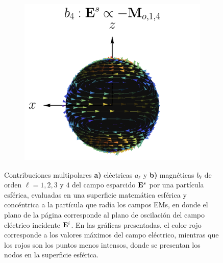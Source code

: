 \begin{figure}[h!]
\begin{subfigure}{.9\linewidth}
		\includegraphics[scale=.25]{1-Teoria/figs/Mo14_static_crop.png}%
		\end{subfigure}
		\caption{Contribuciones multipolares \textbf{a)} eléctricas $a_\ell$ y \textbf{b)} magnéticas $b_\ell$ de orden $\ell = 1,2,3$ y $4$ del campo esparcido $\vb{E}^s$ por una partícula esférica, evaluadas en una superficie matemática esférica y concéntrica a la partícula que radía los campos EMs, en donde el plano de la página corresponde al plano de oscilación del campo eléctrico incidente $\vb{E}^i$. En las gráficas presentadas, el color rojo corresponde a los valores máximos del campo eléctrico, mientras que los rojos son los puntos menos intensos, donde se presentan los nodos en la superficie esférica.}
		\label{fig:Multipolos}
	\end{figure}

